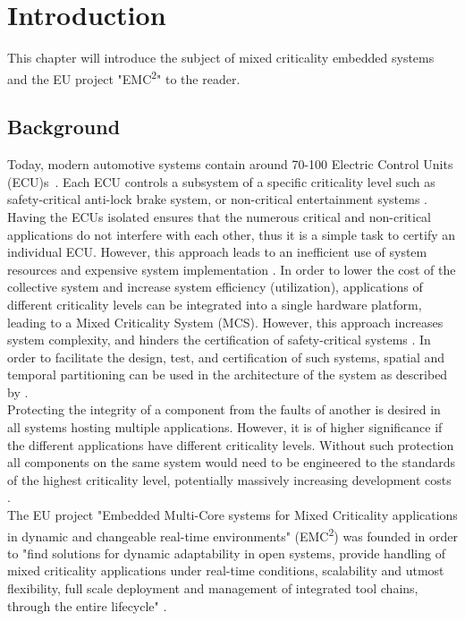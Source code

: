 \chapter{Introduction}
\label{sec:introduction}
This chapter will introduce the subject of mixed criticality embedded systems and the EU project "EMC\textsuperscript{2}" to the reader.

\section{Background}
Today, modern automotive systems contain around 70-100 Electric Control Units (ECU)s~\cite{lemke2012}. Each ECU controls a subsystem of a specific criticality level such as safety-critical anti-lock brake system, or non-critical entertainment systems \cite{weber2015}. Having the ECUs isolated ensures that the numerous critical and non-critical applications do not interfere with each other, thus it is a simple task to certify an individual ECU. However, this approach leads to an inefficient use of system resources and expensive system implementation \cite{burns2016}. In order to lower the cost of the collective system and increase system efficiency (utilization), applications of different criticality levels can be integrated into a single hardware platform, leading to a Mixed Criticality System (MCS). However, this approach increases system complexity, and hinders the certification of safety-critical systems \cite{zaki2016}. %
In order to facilitate the design, test, and certification of such systems, spatial and temporal partitioning can be used in the architecture of the system as described by \cite{zaki2016}.\\

Protecting the integrity of a component from the faults of another is desired in all systems hosting multiple applications. However, it is of higher significance if the different applications have different criticality levels. Without such protection all components on the same system would need to be engineered to the standards of the highest criticality level, potentially massively increasing development costs \cite{burns2016}.\\

The EU project "Embedded Multi-Core systems for Mixed Criticality applications in dynamic and changeable real-time environments" (EMC\textsuperscript{2}) was founded in order to "find solutions for dynamic adaptability in open systems, provide handling of mixed criticality applications under real-time conditions, scalability and utmost flexibility, full scale deployment and management of integrated tool chains, through the entire lifecycle" \cite{weber2015}. 

